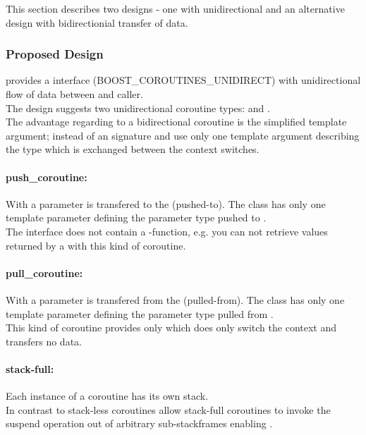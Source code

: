 This section describes two designs - one with unidirectional and an alternative
design with bidirectionial transfer of data.\\

\subsubsection*{Proposed Design}
\boostcoroutine provides a interface (BOOST\_COROUTINES\_UNIDIRECT) with
unidirectional flow of data between \corofunction and caller.\\
The design suggests two unidirectional coroutine types: \pushcoro and
\pullcoro.\\
The advantage regarding to a bidirectional coroutine is the simplified template
argument; instead of an signature \pullcoro and \pushcoro use only one template
argument describing the type which is exchanged between the context switches.

\paragraph*{push\_coroutine:}
With \pushcoro a parameter is transfered to the \corofunction (pushed-to). The
class has only one template parameter defining the parameter type pushed to
\corofunction.\\
\newline
The interface does not contain a -function, e.g. you can not retrieve
values returned by a \corofunction with this kind of coroutine.

\paragraph*{pull\_coroutine:}
With \pullcoro a parameter is transfered from the \corofunction (pulled-from).
The class has only one template parameter defining the parameter type pulled
from \corofunction.\\
\newline
This kind of coroutine provides only \pullcoroop which does only switch the
context and transfers no data.

\paragraph*{stack-full:}
Each instance of a coroutine has its own stack.\\
\newline
In contrast to stack-less coroutines allow stack-full coroutines to invoke the
suspend operation out of arbitrary sub-stackframes enabling \escreops.

